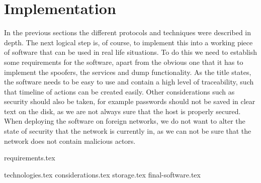 \documentclass{article}
\begin{document}
\section{Implementation}
In the previous sections the different protocols and techniques were described in depth. The next logical step is, of course, to implement this into a working piece of software that can be used in real life situations. To do this we need to establish some requirements for the software, apart from the obvious one that it has to implement the spoofers, the services and dump functionality. As the title states, the software needs to be easy to use and contain a high level of traceability, such that timeline of actions can be created easily. Other considerations such as security should also be taken, for example passwords should not be saved in clear text on the disk, as we are not always sure that the host is properly secured. When deploying the software on foreign networks, we do not want to alter the state of security that the network is currently in, as we can not be sure that the network does not contain malicious actors.

{requirements.tex}

{technologies.tex}
{considerations.tex}
{storage.tex}
{final-software.tex}
\end{document}

